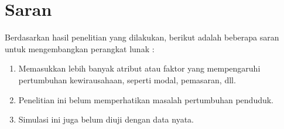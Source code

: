\section{Saran}
Berdasarkan hasil penelitian yang dilakukan, berikut adalah beberapa saran untuk mengembangkan perangkat lunak :
\begin{enumerate}
	\item Memasukkan lebih banyak atribut atau faktor yang mempengaruhi pertumbuhan kewirausahaan, seperti modal, pemasaran, dll.
	\item Penelitian ini belum memperhatikan masalah pertumbuhan penduduk.
	\item Simulasi ini juga belum diuji dengan data nyata.
\end{enumerate}